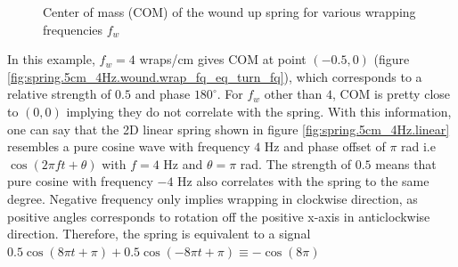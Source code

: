 \documentclass[11pt, a4paper]{article}
\begin{document}
	\begin{figure}[H]
		\centering
		\hfill
		
		\caption{Center of mass (COM) of the wound up spring for various wrapping frequencies $f_{w}$}
		\label{fig:spring.5cm_4Hz.wound.com_plots}
	\end{figure}

	In this example, $f_{w} = 4$ wraps/cm gives COM at point $(-0.5, 0)$ (figure \ref{fig:spring.5cm_4Hz.wound.wrap_fq_eq_turn_fq}), which corresponds to a relative strength of $0.5$ and phase $180^{\circ}$. For $f_{w}$ other than $4$, COM is pretty close to $(0, 0)$ implying they do not correlate with the spring. With this information, one can say that the 2D linear spring shown in figure \ref{fig:spring.5cm_4Hz.linear} resembles a pure cosine wave with frequency $4$ Hz and phase offset of $\pi$ rad i.e $\cos(2\pi ft + \theta)$ with $f = 4$ Hz and $\theta = \pi$ rad. The strength of $0.5$ means that pure cosine with frequency $-4$ Hz also correlates with the spring to the same degree. Negative frequency only implies wrapping in clockwise direction, as positive angles corresponds to rotation off the positive x-axis in anticlockwise direction. Therefore, the spring is equivalent to a signal $0.5\cos(8\pi t + \pi) + 0.5\cos(-8\pi t + \pi) \equiv -\cos(8\pi)$
\end{document}
